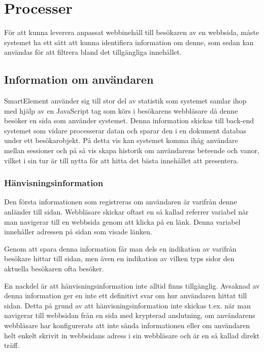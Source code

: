 \section{Processer}

För att kunna leverera anpassat webbinehåll till besökaren av en webbsida, måste systemet ha ett sätt att kunna identifiera information om denne, som sedan kan användas för att filtrera bland det tillgängliga innehållet.

\subsection{Information om användaren}

SmartElement använder sig till stor del av statistik som systemet samlar ihop med hjälp av en JavaScript tag som körs i besökarens webbläsare då denne besöker en sida som använder systemet. Denna information skickas till back-end systemet som vidare processerar datan och sparar den i en dokument databas under ett besökarobjekt. På detta vis kan systemet komma ihåg användare mellan sessioner och på så vis skapa historik om användarens beteende och vanor, vilket i sin tur är till nytta för att hitta det bästa innehållet att presentera.

\subsubsection{Hänvisningsinformation}

Den första informationen som registreras om användaren är varifrån denne anländer till sidan. Webbläsare skickar oftast en så kallad referrer variabel när man navigerar till en webbsida genom att klicka på en länk. Denna variabel innehåller adressen på sidan som visade länken.

Genom att spara denna information får man dels en indikation av varifrån besökare hittar till sidan, men även en indikation av vilken typs sidor den aktuella besökaren ofta besöker.

En nackdel är att hänvisningsinformation inte alltid finns tillgänglig. Avsaknad av denna information ger en inte ett definitivt svar om hur användaren hittat till sidan. Detta på grund av att hänvisningsinformation inte skickas t.ex. när man navigerar till webbsidan från en sida med krypterad anslutning, om användarens webbläsare har konfigurerats att inte sända informationen eller om användaren helt enkelt skrivit in webbsidans adress i sin webbläsare och är en så kallad direkt träff. \citep{httprfc}

